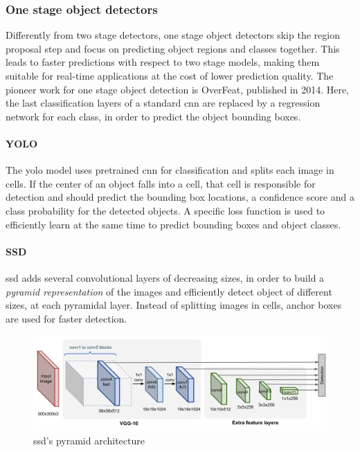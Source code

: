 \documentclass[%
    corpo=12pt,
    twoside,
    stile=classica,   
    tipotesi=magistrale,
    evenboxes,
    english,
	numerazioneromana,
]{toptesi}
\begin{document}
\subsubsection{One stage object detectors}
Differently from two stage detectors, one stage object detectors skip the region proposal step and focus on predicting object regions and classes together. This leads to faster predictions with respect to two stage models, making them suitable for real-time applications at the cost of lower prediction quality. The pioneer work for one stage object detection is OverFeat\cite{sermanet2014overfeat}, published in 2014. Here, the last classification layers of a standard \gls{cnn} are replaced by a regression network for each class, in order to predict the object bounding boxes.

\paragraph{YOLO}\label{sec:yolo}
The \acrfull{yolo} model\cite{redmon2016look} uses pretrained \gls{cnn} for classification and splits each image in cells. If the center of an object falls into a cell, that cell is responsible for detection and should predict the bounding box locations, a confidence score and a class probability for the detected objects. A specific loss function is used to efficiently learn at the same time to predict bounding boxes and object classes.

\paragraph{SSD}
\acrfull{ssd}\cite{Liu_2016} adds several convolutional layers of decreasing sizes, in order to build a \textit{pyramid representation} of the images and efficiently detect object of different sizes, at each pyramidal layer. Instead of splitting images in cells, anchor boxes are used for faster detection.

\begin{figure}
	\centering
	\includegraphics[width=.7\linewidth]{imgs/SSD-architecture.png}
	\caption{\acrshort{ssd}'s pyramid architecture\cite{objdetpart4}}
	\label{fig:ssd}
\end{figure}
\end{document}
